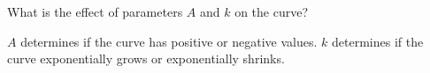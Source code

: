 What is the effect of parameters $A$ and $k$ on the curve?

\begin{solution}
    $A$ determines if the curve has positive or negative values. $k$ determines if the curve exponentially grows or exponentially shrinks.
\end{solution}